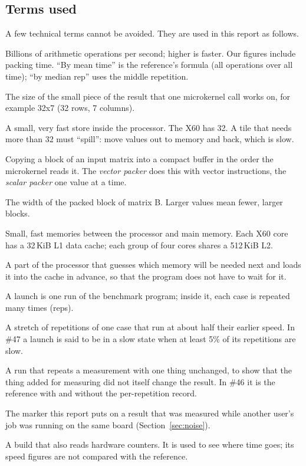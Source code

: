 \documentclass[11pt,a4paper]{article}
\begin{document}
\subsection{Terms used}
A few technical terms cannot be avoided. They are used in this report as follows.
\begin{description}[leftmargin=1.2em,itemsep=0.2ex,font=\normalfont\bfseries]
  \item[GOPs] Billions of arithmetic operations per second; higher is faster. Our figures include packing time.
  ``By mean time'' is the reference's formula (all operations over all time); ``by median rep'' uses the middle
  repetition.
  \item[Tile (MR$\times$NR)] The size of the small piece of the result that one microkernel call works on, for
  example 32x7 (32 rows, 7 columns).
  \item[Vector register] A small, very fast store inside the processor. The X60 has 32. A tile that needs more
  than 32 must ``spill'': move values out to memory and back, which is slow.
  \item[Packing] Copying a block of an input matrix into a compact buffer in the order the microkernel reads it.
  The \emph{vector packer} does this with vector instructions, the \emph{scalar packer} one value at a time.
  \item[\texttt{nc}] The width of the packed block of matrix B. Larger values mean fewer, larger blocks.
  \item[Cache, L1, L2] Small, fast memories between the processor and main memory. Each X60 core has a 32\,KiB
  L1 data cache; each group of four cores shares a 512\,KiB L2.
  \item[Prefetcher] A part of the processor that guesses which memory will be needed next and loads it into the
  cache in advance, so that the program does not have to wait for it.
  \item[Launch, rep] A launch is one run of the benchmark program; inside it, each case is repeated many times
  (reps).
  \item[Slow state] A stretch of repetitions of one case that run at about half their earlier speed. In \#47 a
  launch is said to be in a slow state when at least 5\% of its repetitions are slow.
  \item[Control run] A run that repeats a measurement with one thing unchanged, to show that the thing added
  for measuring did not itself change the result. In \#46 it is the reference with and without the per-repetition record.
  \item[Red note] The marker this report puts on a result that was measured while another user's job was running on the
  same board (Section~\ref{sec:noise}).
  \item[Instrumented build] A build that also reads hardware counters. It is used to see where time goes; its
  speed figures are not compared with the reference.
\end{description}
\end{document}
